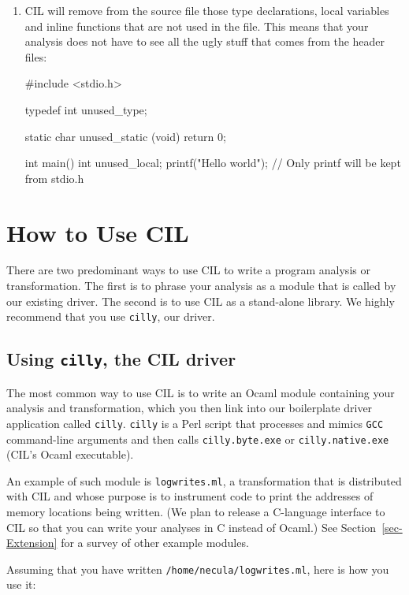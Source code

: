 \documentclass[letterpaper]{article}
\def\secref#1{Section~\ref{sec-#1}}
\def\t#1{{\tt #1}}
\begin{document}
\begin{enumerate}
\item CIL will remove from the source file those type declarations, local
variables and inline functions that are not used in the file. This means that
your analysis does not have to see all the ugly stuff that comes from the
header files:
\begin{cilcode}[global]
#include <stdio.h>

typedef int unused_type;

static char unused_static (void) { return 0; }

int main() {
  int unused_local;
  printf("Hello world\n"); // Only printf will be kept from stdio.h
}
\end{cilcode}

\end{enumerate}

\section{How to Use CIL}\label{sec-cil}

There are two predominant ways to use CIL to write a program analysis or
transformation. The first is to phrase your analysis as a module that is
called by our existing driver. The second is to use CIL as a stand-alone
library. We highly recommend that you use \t{cilly}, our driver.

\subsection{Using \t{cilly}, the CIL driver}

The most common way to use CIL is to write an Ocaml module containing your
analysis and transformation, which you then link into our boilerplate
driver application called \t{cilly}. \t{cilly} is a Perl script that
processes and mimics \t{GCC} command-line arguments and then
calls \t{cilly.byte.exe} or \t{cilly.native.exe} (CIL's Ocaml executable).

An example of such module is \t{logwrites.ml}, a transformation that is
distributed with CIL and whose purpose is to instrument code to print the
addresses of memory locations being written. (We plan to release a
C-language interface to CIL so that you can write your analyses in C
instead of Ocaml.) See \secref{Extension} for a survey of other example
modules.

Assuming that you have written \t{/home/necula/logwrites.ml},
here is how you use it:
\end{document}
